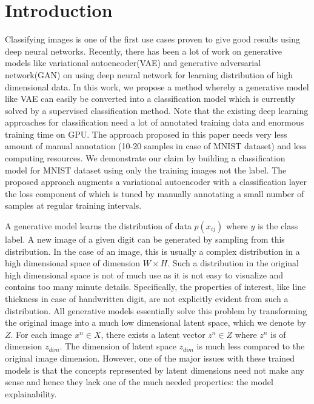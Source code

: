 \documentclass{uai2021} %
\begin{document}
\section{Introduction}\label{sec:intro}
Classifying images is one of the first use cases proven to give good results using deep neural networks.
Recently, there has been a lot of work on generative models like variational autoencoder(VAE)\cite{kingma2013auto} and generative adversarial network(GAN) \cite{goodfellow2014generative} on using deep neural network for learning distribution of high dimensional data.
In this work, we propose a method whereby a generative model like VAE can easily be converted into a classification model which is currently solved by a supervised classification method.
Note that the existing deep learning approaches for classification  need a lot of annotated training data and enormous training time on GPU\cite{krizhevsky2012imagenet}\cite{simonyan2014very}\cite{he2016deep}.
The approach proposed in this paper needs very less amount of manual annotation (10-20 samples in case of MNIST dataset)  and less computing resources.
We demonstrate our claim by building a classification model for MNIST dataset using only the training images not the label.
The proposed approach augments a  variational autoencoder with a classification layer the loss component of which is tuned by manually annotating a small number of samples at regular training intervals.


A generative model learns the distribution of data $p(x_{ij})$ where $y$ is the class label.
A new image of a given digit can be generated by sampling from this distribution.
In the case of an image, this is usually a complex distribution in a high dimensional space of dimension $W \times H$.
Such a distribution in the original high dimensional space is not of much use as it is not easy to visualize and contains too many  minute details.
Specifically, the properties of interest, like line thickness in case of handwritten digit, are not explicitly evident from such a distribution.
All generative models essentially solve this problem by transforming the original image into a much low dimensional latent space, which we denote by  $Z$.
For each image $x^n \in X$, there exists a latent vector  $z^n \in Z$  where $z^n$ is of dimension $z_{dim}$.
The dimension of latent space $z_{dim}$ is much less compared to the original image dimension.
However, one of the major issues with these trained models is that the concepts represented by latent dimensions need not make any sense and hence they lack one of the much needed properties: the model explainability.
\end{document}
